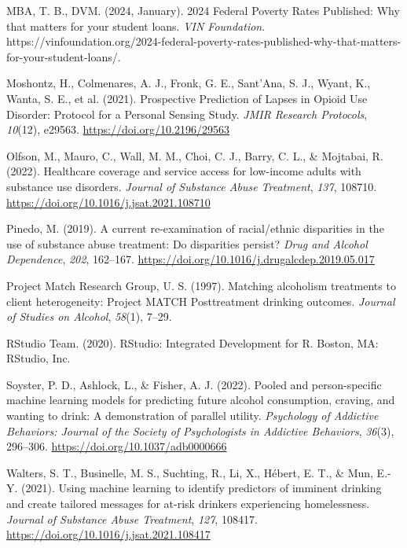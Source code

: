 \documentclass[
]{agujournal2019}
\newlength{\cslhangindent}
\newenvironment{CSLReferences}[2] %
 {\begin{list}{}{%
  \setlength{\itemindent}{0pt}
  \setlength{\leftmargin}{0pt}
  \setlength{\parsep}{0pt}
  \ifodd #1
   \setlength{\leftmargin}{\cslhangindent}
   \setlength{\itemindent}{-1\cslhangindent}
  \fi
  \setlength{\itemsep}{#2\baselineskip}}}
 {\end{list}}
\begin{document}
\begin{CSLReferences}{1}{0}
MBA, T. B., DVM. (2024, January). 2024 {Federal Poverty Rates
Published}: {Why} that matters for your student loans. \emph{VIN
Foundation}.
https://vinfoundation.org/2024-federal-poverty-rates-published-why-that-matters-for-your-student-loans/.

Moshontz, H., Colmenares, A. J., Fronk, G. E., Sant'Ana, S. J., Wyant,
K., Wanta, S. E., et al. (2021). Prospective {Prediction} of {Lapses} in
{Opioid Use Disorder}: {Protocol} for a {Personal Sensing Study}.
\emph{JMIR Research Protocols}, \emph{10}(12), e29563.
\url{https://doi.org/10.2196/29563}

Olfson, M., Mauro, C., Wall, M. M., Choi, C. J., Barry, C. L., \&
Mojtabai, R. (2022). Healthcare coverage and service access for
low-income adults with substance use disorders. \emph{Journal of
Substance Abuse Treatment}, \emph{137}, 108710.
\url{https://doi.org/10.1016/j.jsat.2021.108710}

Pinedo, M. (2019). A current re-examination of racial/ethnic disparities
in the use of substance abuse treatment: {Do} disparities persist?
\emph{Drug and Alcohol Dependence}, \emph{202}, 162--167.
\url{https://doi.org/10.1016/j.drugalcdep.2019.05.017}

Project Match Research Group, U. S. (1997). Matching alcoholism
treatments to client heterogeneity: {Project MATCH Posttreatment}
drinking outcomes. \emph{Journal of Studies on Alcohol}, \emph{58}(1),
7--29.

RStudio Team. (2020). {RStudio}: {Integrated Development} for {R}.
Boston, MA: RStudio, Inc.

Soyster, P. D., Ashlock, L., \& Fisher, A. J. (2022). Pooled and
person-specific machine learning models for predicting future alcohol
consumption, craving, and wanting to drink: {A} demonstration of
parallel utility. \emph{Psychology of Addictive Behaviors: Journal of
the Society of Psychologists in Addictive Behaviors}, \emph{36}(3),
296--306. \url{https://doi.org/10.1037/adb0000666}

Walters, S. T., Businelle, M. S., Suchting, R., Li, X., Hébert, E. T.,
\& Mun, E.-Y. (2021). Using machine learning to identify predictors of
imminent drinking and create tailored messages for at-risk drinkers
experiencing homelessness. \emph{Journal of Substance Abuse Treatment},
\emph{127}, 108417. \url{https://doi.org/10.1016/j.jsat.2021.108417}


\end{CSLReferences}
\end{document}
